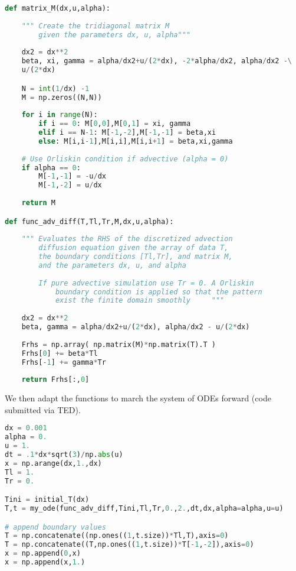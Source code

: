 \documentclass[11pt]{article}
\begin{document}
\begin{lstlisting}[language=Python]
def matrix_M(dx,u,alpha):
    
    """ Create the tridiagonal matrix M 
        given the parameters dx, u, alpha"""
    
    dx2 = dx**2
    beta, xi, gamma = alpha/dx2+u/(2*dx), -2*alpha/dx2, alpha/dx2 -\
    u/(2*dx)

    N = int(1/dx) -1
    M = np.zeros((N,N))
    
    for i in range(N):
        if i == 0: M[0,0],M[0,1] = xi, gamma
        elif i == N-1: M[-1,-2],M[-1,-1] = beta,xi
        else: M[i,i-1],M[i,i],M[i,i+1] = beta,xi,gamma
            
    # Use Orliskin condition if advective (alpha = 0)
    if alpha == 0:
        M[-1,-1] = -u/dx
        M[-1,-2] = u/dx
            
    return M    

def func_adv_diff(T,Tl,Tr,M,dx,u,alpha):
    
    """ Evaluates the RHS of the discretized advection
        diffusion equation given the array of data T, 
        the boundary conditions [Tl,Tr], and matrix M,
        and the parameters dx, u, and alpha 
        
        If pure advective simulation use Tr = 0. A Orliskin
            boundary condition is applied so that the pattern
            exist the finite domain smoothly     """
    
    dx2 = dx**2
    beta, gamma = alpha/dx2+u/(2*dx), alpha/dx2 - u/(2*dx)
    
    Frhs = np.array( np.matrix(M)*np.matrix(T).T )
    Frhs[0] += beta*Tl
    Frhs[-1] += gamma*Tr
    
    return Frhs[:,0]\end{lstlisting}

We then adapt the functions to march the system of ODEs forward (code submitted via TED). 

\begin{lstlisting}[language=Python]
dx = 0.001
alpha = 0.
u = 1.
dt = .1*dx*sqrt(3)/np.abs(u)
x = np.arange(dx,1.,dx)
Tl = 1.
Tr = 0.

Tini = initial_T(dx)
T,t = my_ode(func_adv_diff,Tini,Tl,Tr,0.,2.,dt,dx,alpha=alpha,u=u)

# append boundary values
T = np.concatenate((np.ones((1,t.size))*Tl,T),axis=0)
T = np.concatenate((T,np.ones((1,t.size))*T[-1,-2]),axis=0)
x = np.append(0,x)
x = np.append(x,1.)
\end{lstlisting}
\end{document}
